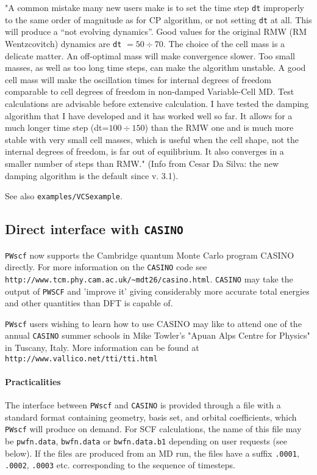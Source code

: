 \documentclass[12pt,a4paper]{article}
\begin{document}
"A common mistake many new users make is to set the time step \texttt{dt}
improperly to the same order of magnitude as for CP algorithm, or
not setting \texttt{dt} at all. This will produce a ``not evolving dynamics''.
Good values for the original RMW (RM Wentzcovitch) dynamics are 
\texttt{dt} $ = 50 \div 70$. The choice of the cell mass is a delicate matter. An
off-optimal mass will make convergence slower. Too small masses, as
well as too long time steps, can make the algorithm unstable. A good
cell mass will make the oscillation times for internal degrees of
freedom comparable to cell degrees of freedom in non-damped
Variable-Cell MD. Test calculations are advisable before extensive
calculation. I have tested the damping algorithm that I have developed
and it has worked well so far. It allows for a much longer time step
(dt=$100 \div 150$) than the RMW one and is much more stable with very
small cell masses, which is useful when the cell shape, not the
internal degrees of freedom, is far out of equilibrium. It also
converges in a smaller number of steps than RMW." (Info from Cesar Da
Silva: the new damping algorithm is the default since v. 3.1).

See also \texttt{examples/VCSexample}.

\subsection{Direct interface with \texttt{CASINO}} \label{pw2casino_info}

\texttt{PWscf} now supports the Cambridge quantum Monte Carlo program CASINO directly. For more information
on the \texttt{CASINO} code see \texttt{http://www.tcm.phy.cam.ac.uk/\~{}mdt26/casino.html}. 
\texttt{CASINO} may take the output of \texttt{PWSCF} and
'improve it' giving considerably more accurate total energies and other
quantities than DFT is capable of.


\texttt{PWscf} users wishing to learn how to use CASINO may like to attend one
of the annual \texttt{CASINO} summer schools in Mike Towler's "Apuan Alps Centre
for Physics" in Tuscany, Italy. More information can be found at \texttt{http://www.vallico.net/tti/tti.html} 
\paragraph{Practicalities}
The interface between \texttt{PWscf} and \texttt{CASINO} is provided through a file with a
standard format containing geometry, basis set, and orbital coefficients, which
\texttt{PWscf} will produce on demand. For SCF calculations, the name of this file may
be \texttt{pwfn.data}, \texttt{bwfn.data} or \texttt{bwfn.data.b1} depending on user requests (see below).
If the files are produced from an MD run, the files have a suffix \texttt{.0001}, \texttt{.0002},
\texttt{.0003} etc.  corresponding to the sequence of timesteps.
\end{document}
